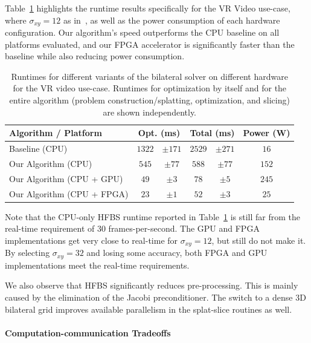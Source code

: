 Table~\ref{table:jump_runtimes} highlights the runtime results specifically for the VR Video use-case, where $\sigma_{xy} = 12$ as in~\cite{googlejump}, as well as the power consumption of each hardware configuration. Our algorithm's speed outperforms the CPU baseline on all platforms evaluated, and our FPGA accelerator is significantly faster than the baseline while also reducing power consumption.

\begin{table}[h]
\centering
\caption{Runtimes for different variants of the bilateral solver on different hardware for the VR video use-case. Runtimes for optimization by itself and for the entire algorithm (problem construction/splatting, optimization, and slicing) are shown independently.}


\begin{tabular}{@{}lc@{}cc@{}cc}
\toprule
Algorithm / Platform & \multicolumn{2}{c}{Opt. (ms) } & \multicolumn{2}{c}{Total (ms)} & Power (W) \\ \midrule
 Baseline (CPU) & $1322$ & $\pm 171$ & $2529$ & $\pm 271$ & $16$ \\
                               Our Algorithm (CPU) & $545$ & $\pm 77$ & $588$ & $\pm 77$ & $152$ \\
                         Our Algorithm (CPU + GPU) & $49$ & $\pm 3$ & $78$ & $\pm 5$ & $245$ \\
                        Our Algorithm (CPU + FPGA) & $23$ & $\pm 1$ & $52$ & $\pm 3$ & $25$ \\
\bottomrule
\end{tabular}

\label{table:jump_runtimes}

\end{table}

Note that the CPU-only HFBS runtime reported in Table~\ref{table:jump_runtimes} is still far from the real-time requirement of 30 frames-per-second. The GPU and FPGA implementations get very close to real-time for $\sigma_{xy} = 12$, but still do not make it.
By selecting $\sigma_{xy} = 32$ and losing some accuracy, both FPGA and GPU implementations meet the real-time requirements.

We also observe that HFBS significantly reduces pre-processing. This is mainly caused by the elimination of the Jacobi preconditioner. The switch to a dense 3D bilateral grid improves available parallelism in the splat-slice routines as well.


\paragraph{Computation-communication Tradeoffs}

